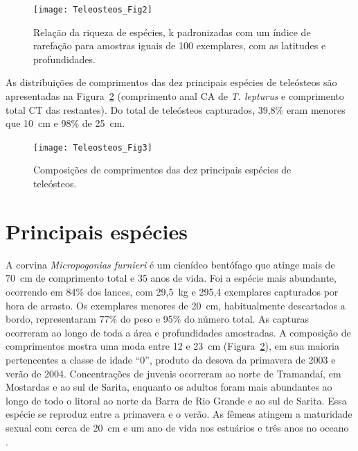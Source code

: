 \documentclass[a4paper,11pt,twoside,showtrims,onecolumn,openright,final]{memoir}
\begin{document}


%
%

\begin{figure}
\begin{center}
\texttt{[image: Teleosteos\_Fig2]}
\end{center}
\caption[Relação da riqueza de espécies com as latitudes e profundidades]
	{Relação da riqueza de espécies, k padronizadas com um índice de rarefação para amostras 
         iguais de 100 exemplares, com as latitudes e profundidades.}
\label{fig:teleosteos2}
\end{figure}


As distribuições de comprimentos das dez principais espécies de teleósteos são apresentadas na Figura~\ref{fig:teleosteos3}
(comprimento anal CA de \emph{T. lepturus} e comprimento total CT das restantes). 
Do total de teleósteos capturados, 39,8\% eram menores que 10~cm e 98\% de 25~cm.%

%
%

\begin{figure}
\begin{center}
\texttt{[image: Teleosteos\_Fig3]}
\end{center}
\caption[Composições de comprimentos das dez principais espécies de teleósteos]
	{Composições de comprimentos das dez principais espécies de teleósteos.}
\label{fig:teleosteos3}
\end{figure}


\section*{Principais espécies}

A corvina \emph{Micropogonias furnieri} é um cienídeo bentófago que atinge mais de 70~cm 
de comprimento total e 35 anos de vida. Foi a espécie mais abundante, ocorrendo 
em 84\% dos lances, com 29,5~kg e 295,4 exemplares capturados por 
hora de arrasto. Os exemplares menores de 20~cm, habitualmente descartados a bordo, 
representaram 77\% do peso e 95\% do número total. As capturas ocorreram 
ao longo de toda a área e profundidades amostradas. A composição de comprimentos mostra 
uma moda entre 12 e 23~cm (Figura~\ref{fig:teleosteos3}), 
em sua maioria pertencentes a classe de idade ``0'', 
produto da desova da primavera de 2003 e verão de 2004. Concentrações de juvenis ocorreram 
ao norte de Tramandaí, em Mostardas e ao sul de Sarita, enquanto os adultos foram mais 
abundantes ao longo de todo o litoral ao norte da Barra de Rio Grande e ao sul de Sarita. 
Essa espécie se reproduz entre a primavera e o verão. As fêmeas atingem a maturidade sexual 
com cerca de 20~cm e um ano de vida nos estuários e três anos 
no oceano \citep{castello1985,haimovici2005a}.
\end{document}
